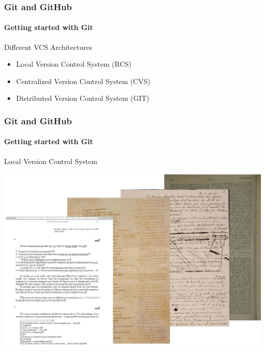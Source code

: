 \begin{frame}
    \frametitle{Git and GitHub}
    \framesubtitle{Getting started with Git}
    \addtocounter{nframe}{1}
    
    \begin{block}{Different VCS Architectures}
        \begin{itemize}
            \item Local Version Control System (RCS)
            \item Centralized Version Control System (CVS)
            \item Distributed Version Control System (GIT)
        \end{itemize}
    \end{block}

\end{frame}

\begin{frame}
    \frametitle{Git and GitHub}
    \framesubtitle{Getting started with Git}
    \addtocounter{nframe}{1}
    
    \begin{block}{Local Version Control System}
        \begin{center}

            \includegraphics[width=.9\textwidth]{imgs/TestiVariSupporti.pdf}
    
        \end{center}
    
    \end{block}

\end{frame}


